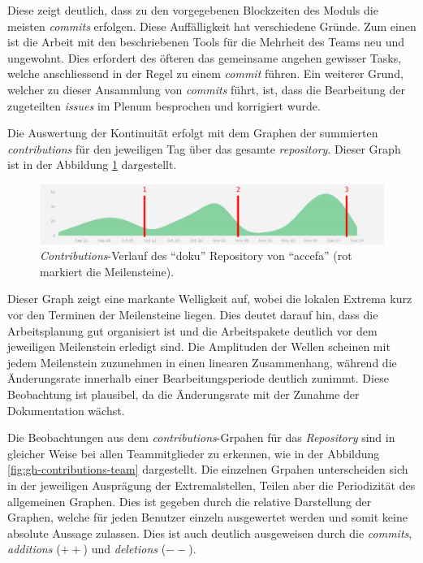 Diese zeigt deutlich, dass zu den vorgegebenen Blockzeiten des Moduls
die meisten \emph{commits} erfolgen. Diese Auffälligkeit hat verschiedene
Gründe. Zum einen ist die Arbeit mit den beschriebenen Tools für die
Mehrheit des Teams neu und ungewohnt. Dies erfordert des öfteren das
gemeinsame angehen gewisser Tasks, welche anschliessend in der Regel zu
einem \emph{commit} führen. Ein weiterer Grund, welcher zu dieser
Ansammlung von \emph{commits} führt, ist, dass die Bearbeitung der
zugeteilten \emph{issues} im Plenum besprochen und korrigiert wurde.

Die Auswertung der Kontinuität erfolgt mit dem Graphen der summierten
\emph{contributions} für den jeweiligen Tag über das gesamte
\emph{repository}. Dieser Graph ist in der Abbildung 
\ref{fig:gh-contributions-ov} dargestellt.

\begin{figure}[h!]
	\centering
	\includegraphics[width=1\textwidth]{../../fig/pm/gh-contributions-ov_marked.pdf}
	\caption{\emph{Contributions}-Verlauf des ``doku'' Repository
		von ``accefa'' (rot markiert die Meilensteine).}
	\label{fig:gh-contributions-ov}
\end{figure}

Dieser Graph zeigt eine markante Welligkeit auf, wobei die lokalen Extrema
kurz vor den Terminen der Meilensteine liegen. Dies deutet darauf hin, dass
die Arbeitsplanung gut organisiert ist und die Arbeitspakete deutlich vor
dem jeweiligen Meilenstein erledigt sind. Die Amplituden der Wellen
scheinen mit jedem Meilenstein zuzunehmen in einen linearen Zusammenhang,
während die Änderungsrate innerhalb einer Bearbeitungsperiode deutlich zunimmt.
Diese Beobachtung ist plausibel, da die Änderungsrate mit der Zunahme der
Dokumentation wächst.

Die Beobachtungen aus dem \emph{contributions}-Grpahen für das
\emph{Repository} sind in gleicher Weise bei allen Teammitglieder zu erkennen,
wie in der Abbildung \ref{fig:gh-contributions-team} dargestellt. Die einzelnen
Grpahen unterscheiden sich in der jeweiligen Ausprägung der Extremalstellen,
Teilen aber die Periodizität des allgemeinen Graphen. Dies ist gegeben durch
die relative Darstellung der Graphen, welche für jeden Benutzer einzeln
ausgewertet werden und somit keine absolute Aussage zulassen. Dies ist auch
deutlich ausgeweisen durch die \emph{commits}, \emph{additions} ($++$) und
\emph{deletions} ($--$).

